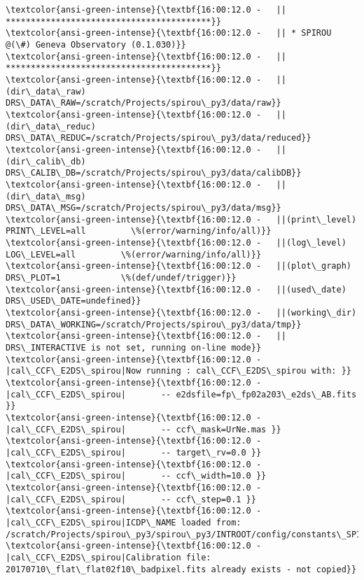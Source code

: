 \documentclass[11pt]{article}
\begin{document}
    \begin{Verbatim}[commandchars=\\\{\}]
\textcolor{ansi-green-intense}{\textbf{16:00:12.0 -   || *****************************************}}
\textcolor{ansi-green-intense}{\textbf{16:00:12.0 -   || * SPIROU @(\#) Geneva Observatory (0.1.030)}}
\textcolor{ansi-green-intense}{\textbf{16:00:12.0 -   || *****************************************}}
\textcolor{ansi-green-intense}{\textbf{16:00:12.0 -   ||(dir\_data\_raw)      DRS\_DATA\_RAW=/scratch/Projects/spirou\_py3/data/raw}}
\textcolor{ansi-green-intense}{\textbf{16:00:12.0 -   ||(dir\_data\_reduc)    DRS\_DATA\_REDUC=/scratch/Projects/spirou\_py3/data/reduced}}
\textcolor{ansi-green-intense}{\textbf{16:00:12.0 -   ||(dir\_calib\_db)      DRS\_CALIB\_DB=/scratch/Projects/spirou\_py3/data/calibDB}}
\textcolor{ansi-green-intense}{\textbf{16:00:12.0 -   ||(dir\_data\_msg)      DRS\_DATA\_MSG=/scratch/Projects/spirou\_py3/data/msg}}
\textcolor{ansi-green-intense}{\textbf{16:00:12.0 -   ||(print\_level)       PRINT\_LEVEL=all         \%(error/warning/info/all)}}
\textcolor{ansi-green-intense}{\textbf{16:00:12.0 -   ||(log\_level)         LOG\_LEVEL=all         \%(error/warning/info/all)}}
\textcolor{ansi-green-intense}{\textbf{16:00:12.0 -   ||(plot\_graph)        DRS\_PLOT=1            \%(def/undef/trigger)}}
\textcolor{ansi-green-intense}{\textbf{16:00:12.0 -   ||(used\_date)         DRS\_USED\_DATE=undefined}}
\textcolor{ansi-green-intense}{\textbf{16:00:12.0 -   ||(working\_dir)       DRS\_DATA\_WORKING=/scratch/Projects/spirou\_py3/data/tmp}}
\textcolor{ansi-green-intense}{\textbf{16:00:12.0 -   ||                    DRS\_INTERACTIVE is not set, running on-line mode}}
\textcolor{ansi-green-intense}{\textbf{16:00:12.0 -   |cal\_CCF\_E2DS\_spirou|Now running : cal\_CCF\_E2DS\_spirou with: }}
\textcolor{ansi-green-intense}{\textbf{16:00:12.0 -   |cal\_CCF\_E2DS\_spirou|       -- e2dsfile=fp\_fp02a203\_e2ds\_AB.fits }}
\textcolor{ansi-green-intense}{\textbf{16:00:12.0 -   |cal\_CCF\_E2DS\_spirou|       -- ccf\_mask=UrNe.mas }}
\textcolor{ansi-green-intense}{\textbf{16:00:12.0 -   |cal\_CCF\_E2DS\_spirou|       -- target\_rv=0.0 }}
\textcolor{ansi-green-intense}{\textbf{16:00:12.0 -   |cal\_CCF\_E2DS\_spirou|       -- ccf\_width=10.0 }}
\textcolor{ansi-green-intense}{\textbf{16:00:12.0 -   |cal\_CCF\_E2DS\_spirou|       -- ccf\_step=0.1 }}
\textcolor{ansi-green-intense}{\textbf{16:00:12.0 -   |cal\_CCF\_E2DS\_spirou|ICDP\_NAME loaded from: /scratch/Projects/spirou\_py3/spirou\_py3/INTROOT/config/constants\_SPIROU.py}}
\textcolor{ansi-green-intense}{\textbf{16:00:12.0 -   |cal\_CCF\_E2DS\_spirou|Calibration file: 20170710\_flat\_flat02f10\_badpixel.fits already exists - not copied}}

\end{Verbatim}
\end{document}
